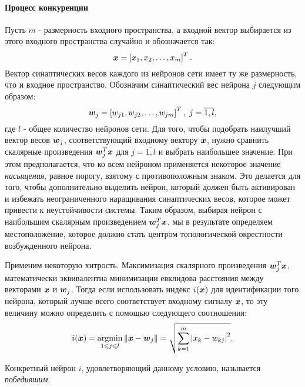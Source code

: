 \documentclass[a4paper,12pt]{report}
\begin{document}
\paragraph{Процесс конкуренции}
Пусть $m$ - размерность входного пространства, а входной вектор
выбирается из этого входного пространства случайно и обозначается так:
\begin{equation}
    \boldsymbol{x} =  \left[ x_1, x_2, \dots, x_m \right]^{T}.
\end{equation}
Вектор синаптических весов каждого из нейронов сети имеет ту же
размерность, что и входное пространство. Обозначим синаптический вес
нейрона $j$ следующим образом:
\begin{equation}
    \boldsymbol{w}_j = \left[ w_{j1}, w_{j2}, \dots, w_{jm} \right]^{T},\
    j=\overline{1,l},
\end{equation}
где $l$ - общее количество нейронов сети. Для того, чтобы подобрать
наилучший вектор весов $\boldsymbol{w}_j$, соответствующий входному вектору
$\boldsymbol{x}$, нужно сравнить скалярные произведения $\boldsymbol{w}_j^{T}\boldsymbol{x}$ для
$j=\overline{1,l}$ и выбрать наибольшее значение. При этом
предполагается, что ко всем нейроном применяется некоторое значение
\textit{насыщения}, равное порогу, взятому с противоположным знаком.
Это делается для того, чтобы дополнительно выделить нейрон, который
должен быть активирован и избежать неограниченного наращивания
синаптических весов, которое может привести к неустойчивости системы.
Таким образом, выбирая нейрон с наибольшим скалярным произведением
$\boldsymbol{w}_j^{T}\boldsymbol{x}$, мы в результате определяем местоположение, которое
должно стать центром топологической окрестности возбужденного нейрона.

Применим некоторую хитрость. Максимизация скалярного произведения
$\boldsymbol{w}_j^{T}\boldsymbol{x}$, математически эквивалентна минимизации евклидова
расстояния между векторами $\boldsymbol{x}$ и $\boldsymbol{w}_j$. Тогда если
использовать индекс $i(\boldsymbol{x})$ для идентификации того нейрона, который
лучше всего соответствует входному сигналу $\boldsymbol{x}$, то эту величину
можно определить с помощью следующего соотношения:
\begin{equation}
    i(\boldsymbol{x}) = \operatorname*{argmin}_{1\leqslant j\leqslant l}{\lVert\boldsymbol{x} - \boldsymbol{w}_j\rVert} =
    \sqrt{\sum_{k=1}^{m}{\left|x_k-w_{kj}\right|^{2}}}.
\end{equation}

Конкретный нейрон $i$, удовлетворяющий данному условию, называется
\textit{победившим}.
\end{document}
